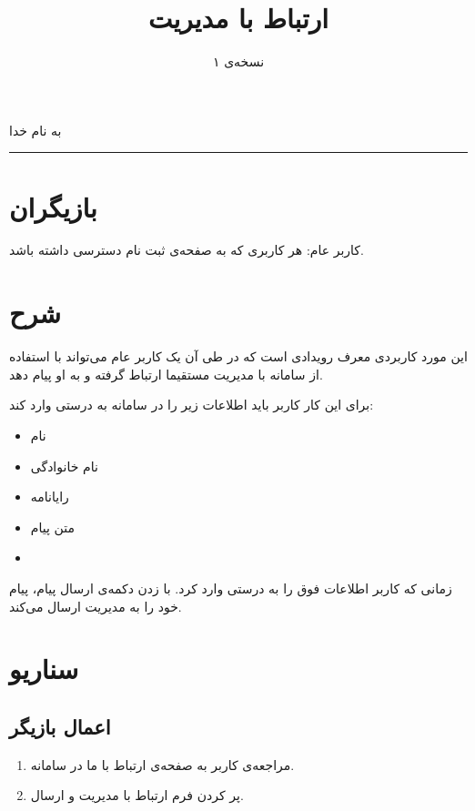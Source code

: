\documentclass[a4paper]{article}
\title{\textbf{ارتباط با مدیریت}}
\author{نسخه‌ی ۱}
\date{}
\begin{document}
\begin{center}
به نام خدا
\end{center}
{\let\newpage\relax\maketitle}
\maketitle
\rule{\textwidth}{2pt}
\section{بازیگران}
کاربر عام: هر کاربری که به صفحه‌ی ثبت‌ نام دسترسی داشته باشد. 
\section{شرح}
این مورد کاربردی معرف رویدادی است که در طی آن یک کاربر عام می‌تواند با استفاده از سامانه با مدیریت مستقیما ارتباط گرفته و به او پیام دهد.

برای این کار کاربر باید اطلاعات زیر را در سامانه به درستی وارد کند:
\begin{itemize}
\item
نام
\item
نام خانوادگی
\item
رایانامه
\item
متن پیام
\item
{}
\end{itemize}
زمانی که کاربر اطلاعات فوق را به درستی وارد کرد. با زدن دکمه‌ی ارسال پیام، پیام خود را به مدیریت ارسال می‌کند.
\section{سناریو}
\subsection{اعمال بازیگر}
\begin{enumerate}
\item
مراجعه‌ی کاربر به صفحه‌ی ارتباط با ما در سامانه.
\item
پر کردن فرم ارتباط با مدیریت و ارسال.
\end{enumerate}
\end{document}
